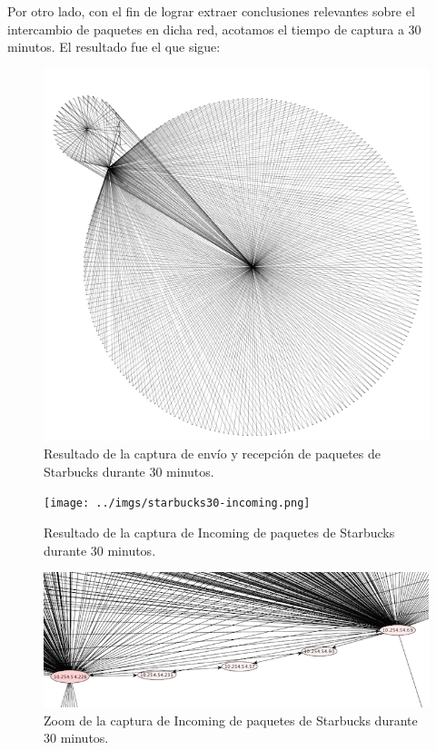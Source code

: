 \documentclass[10pt, a4paper]{article}
\begin{document}
Por otro lado, con el fin de lograr extraer conclusiones relevantes sobre el intercambio de paquetes en dicha red, acotamos el tiempo de captura a 30 minutos. El resultado fue el que sigue:

\begin{figure}[H] %
\begin{center}
\includegraphics[width=400pt]{../imgs/starbucks30_entero.png}
\caption{Resultado de la captura de envío y recepción de paquetes de Starbucks durante 30 minutos.}
\end{center}
\end{figure}

\begin{figure}[H] %
\begin{center}
\texttt{[image: ../imgs/starbucks30-incoming.png]}
\caption{Resultado de la captura de Incoming de paquetes de Starbucks durante 30 minutos.}
\end{center}
\end{figure}

\begin{figure}[H] %
\begin{center}
\includegraphics[width=400pt]{../imgs/zoom-starbucks-incoming.png}
\caption{Zoom de la captura de Incoming de paquetes de Starbucks durante 30 minutos.}
\end{center}
\end{figure}
\end{document}
